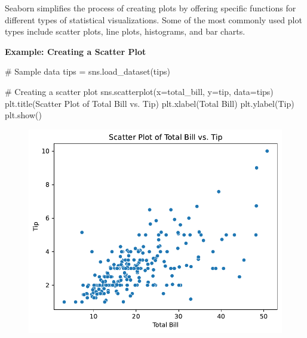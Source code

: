 \documentclass[
  letterpaper,
  DIV=11,
  numbers=noendperiod]{scrreprt}
\newenvironment{Shaded}{\begin{snugshade}}{\end{snugshade}}
\newcommand{\CommentTok}[1]{\textcolor[rgb]{0.37,0.37,0.37}{#1}}
\newcommand{\NormalTok}[1]{\textcolor[rgb]{0.00,0.23,0.31}{#1}}
\newcommand{\OperatorTok}[1]{\textcolor[rgb]{0.37,0.37,0.37}{#1}}
\newcommand{\StringTok}[1]{\textcolor[rgb]{0.13,0.47,0.30}{#1}}
\begin{document}
Seaborn simplifies the process of creating plots by offering specific
functions for different types of statistical visualizations. Some of the
most commonly used plot types include scatter plots, line plots,
histograms, and bar charts.

\textbf{Example: Creating a Scatter Plot}

\begin{Shaded}
\begin{Highlighting}[]
\CommentTok{\# Sample data}
\NormalTok{tips }\OperatorTok{=}\NormalTok{ sns.load\_dataset(}\StringTok{\textquotesingle{}tips\textquotesingle{}}\NormalTok{)}

\CommentTok{\# Creating a scatter plot}
\NormalTok{sns.scatterplot(x}\OperatorTok{=}\StringTok{\textquotesingle{}total\_bill\textquotesingle{}}\NormalTok{, y}\OperatorTok{=}\StringTok{\textquotesingle{}tip\textquotesingle{}}\NormalTok{, data}\OperatorTok{=}\NormalTok{tips)}
\NormalTok{plt.title(}\StringTok{\textquotesingle{}Scatter Plot of Total Bill vs. Tip\textquotesingle{}}\NormalTok{)}
\NormalTok{plt.xlabel(}\StringTok{\textquotesingle{}Total Bill\textquotesingle{}}\NormalTok{)}
\NormalTok{plt.ylabel(}\StringTok{\textquotesingle{}Tip\textquotesingle{}}\NormalTok{)}
\NormalTok{plt.show()}
\end{Highlighting}
\end{Shaded}

\begin{figure}[H]

{\centering \includegraphics{15_Data_Vis_files/figure-pdf/cell-10-output-1.pdf}

}

\end{figure}
\end{document}
